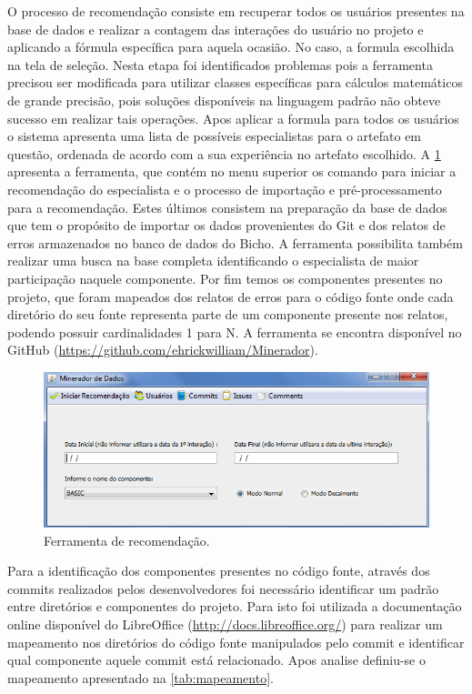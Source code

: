 \documentclass[oneside,brazil,a4paper]{normas-utf-tex}
\begin{document}
O processo de recomendação consiste em recuperar todos os usuários presentes na base de dados e realizar a contagem das interações do usuário no projeto e aplicando a fórmula específica para aquela ocasião. No caso, a formula escolhida na tela de seleção. Nesta etapa foi identificados problemas pois a ferramenta precisou ser modificada para utilizar classes específicas para cálculos matemáticos de grande precisão, pois soluções disponíveis na linguagem padrão não obteve sucesso em realizar tais operações. Apos aplicar a formula para todos os usuários o sistema apresenta uma lista de possíveis especialistas para o artefato em questão, ordenada de acordo com a sua experiência no artefato escolhido. A \cref{fig:ferra} apresenta a ferramenta, que contém no menu superior os comando para iniciar a recomendação do especialista e o processo de importação e pré-processamento para a recomendação. Estes últimos consistem na preparação da base de dados que tem o propósito de importar os dados provenientes do Git e dos relatos de erros armazenados no banco de dados do Bicho. A ferramenta possibilita também realizar uma busca na base completa identificando o especialista de maior participação naquele componente. Por fim temos os componentes presentes no projeto, que foram mapeados dos relatos de erros para o código fonte onde cada diretório do seu fonte representa parte de um componente presente nos relatos, podendo possuir cardinalidades 1 para N. A ferramenta se encontra disponível no GitHub (\url{https://github.com/ehrickwilliam/Minerador}).

\begin{figure}[bt]
    \centering
    \includegraphics[width=.8\textwidth]{figuras/ferramenta}
    \caption{Ferramenta de recomendação.}
    \label{fig:ferra}
\end{figure}


Para a identificação dos componentes presentes no código fonte, através dos commits realizados pelos desenvolvedores foi necessário identificar um padrão entre diretórios e componentes do projeto. Para isto foi utilizada a documentação online disponível do LibreOffice (\url{http://docs.libreoffice.org/}) para realizar um mapeamento nos diretórios do código fonte manipulados pelo commit e identificar qual componente aquele commit está relacionado. Apos analise definiu-se o mapeamento apresentado na \cref{tab:mapeamento}.
\end{document}
